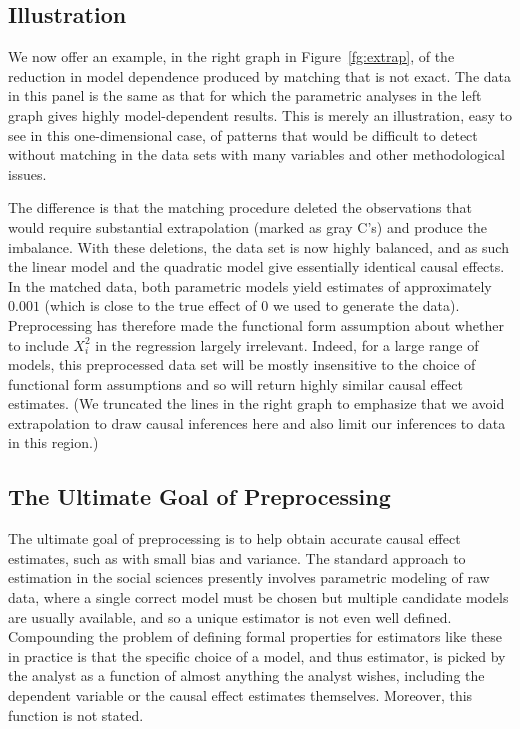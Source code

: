 \documentclass[11pt,titlepage]{article}
\begin{document}
\subsection{Illustration}
We now offer an example, in the right graph in Figure~\ref{fg:extrap},
of the reduction in model dependence produced by matching that is not
exact.  The data in this panel is the same as that for which the
parametric analyses in the left graph gives highly model-dependent
results.  This is merely an illustration, easy to see in this
one-dimensional case, of patterns that would be difficult to detect
without matching in the data sets with many variables and other
methodological issues.

The difference is that the matching procedure deleted the observations
that would require substantial extrapolation (marked as gray C's) and
produce the imbalance.  With these deletions, the data set is now
highly balanced, and as such the linear model and the quadratic model
give essentially identical causal effects.  In the matched data, both
parametric models yield estimates of approximately $0.001$ (which is
close to the true effect of $0$ we used to generate the data).
Preprocessing has therefore made the functional form assumption about
whether to include $X_i^2$ in the regression largely irrelevant.
Indeed, for a large range of models, this preprocessed data set will
be mostly insensitive to the choice of functional form assumptions and
so will return highly similar causal effect estimates.  (We truncated
the lines in the right graph to emphasize that we avoid extrapolation
to draw causal inferences here and also limit our inferences to data
in this region.)

\subsection{The Ultimate Goal of Preprocessing} \label{s:ultim}
The ultimate goal of preprocessing is to help obtain accurate causal
effect estimates, such as with small bias and variance.  The standard
approach to estimation in the social sciences presently involves
parametric modeling of raw data, where a single correct model must be
chosen but multiple candidate models are usually available, and so a
unique estimator is not even well defined.  Compounding the problem of
defining formal properties for estimators like these in practice is
that the specific choice of a model, and thus estimator, is picked by
the analyst as a function of almost anything the analyst wishes,
including the dependent variable or the causal effect estimates
themselves.  Moreover, this function is not stated.
\end{document}
